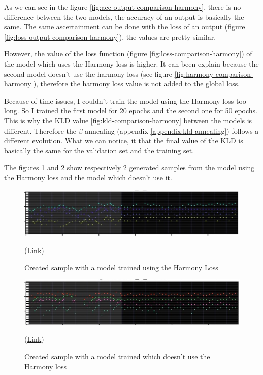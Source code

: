 \documentclass[12pt]{report}
\begin{document}
As we can see in the figure \ref{fig:acc-output-comparison-harmony}, there is no difference between the two models, the accuracy of an output is basically the same.
The same ascertainment can be done with the loss of an output (figure \ref{fig:loss-output-comparison-harmony}), the values are pretty similar.

However, the value of the loss function (figure \ref{fig:loss-comparison-harmony}) of the model which uses the Harmony loss is higher.
It can been explain because the second model doesn't use the harmony loss (see figure \ref{fig:harmony-comparison-harmony}), therefore the harmony loss value is not added to the global loss.

Because of time issues, I couldn't train the model using the Harmony loss too long.
So I trained the first model for 20 epochs and the second one for 50 epochs.
This is why the KLD value \ref{fig:kld-comparison-harmony} between the models is different.
Therefore the $\beta$ annealing (appendix \ref{appendix:kld-annealing}) follows a different evolution.
What we can notice, it that the final value of the KLD is basically the same for the validation set and the training set.


The figures \ref{fig:exp:harmony:with} and \ref{fig:exp:harmony:without} show respectively 2 generated samples from the model using the Harmony loss and the model which doesn't use it.

\begin{figure}[htbp]
    \centering
    \includegraphics[width=\textwidth]{images/experiences/harmony-rnn/with-harmony.jpg}
    \caption{Created sample with a model trained using the Harmony Loss}
    (\href{https://github.com/ValentinVignal/midiGenerator/blob/master/samples/harmony-comparison/generated_with_harmony.mid}{Link})
    \label{fig:exp:harmony:with}
\end{figure}
\begin{figure}[htbp]
    \centering
    \includegraphics[width=\textwidth]{images/experiences/harmony-rnn/without-harmony.jpg}
    \caption{Created sample with a model trained which doesn't use the Harmony loss}
    (\href{https://github.com/ValentinVignal/midiGenerator/blob/master/samples/harmony-comparison/generated_without_harmony.mid}{Link})
    \label{fig:exp:harmony:without}
\end{figure}
\end{document}
